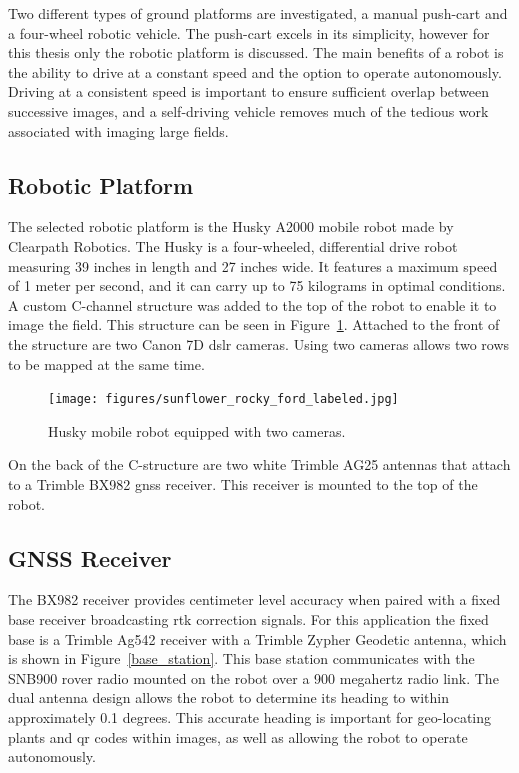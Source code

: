 Two different types of ground platforms are investigated, a manual push-cart and a four-wheel robotic vehicle.  The push-cart excels in its simplicity, however for this thesis only the robotic platform is discussed.  The main benefits of a robot is the ability to drive at a constant speed and the option to operate autonomously.  Driving at a consistent speed is important to ensure sufficient overlap between successive images, and a self-driving vehicle removes much of the tedious work associated with imaging large fields.  

\subsection{Robotic Platform}

The selected robotic platform is the Husky A2000 mobile robot made by Clearpath Robotics.  The Husky is a four-wheeled, differential drive robot measuring 39 inches in length and 27 inches wide.  It features a maximum speed of 1 meter per second, and it can carry up to 75 kilograms in optimal conditions.  A custom C-channel structure was added to the top of the robot to enable it to image the field.  This structure can be seen in Figure~\ref{husky_rocky_ford}.  Attached to the front of the structure are two Canon 7D \ac{dslr} cameras.  Using two cameras allows two rows to be mapped at the same time. 

\begin{figure}
	\centering
    \texttt{[image: figures/sunflower\_rocky\_ford\_labeled.jpg]}
    \caption[Husky robot]{Husky mobile robot equipped with two cameras.}
    \label{husky_rocky_ford}
\end{figure}

On the back of the C-structure are two white Trimble AG25 antennas that attach to a Trimble BX982 \ac{gnss} receiver.  This receiver is mounted to the top of the robot.

\subsection{GNSS Receiver}

The BX982 receiver provides centimeter level accuracy when paired with a fixed base receiver broadcasting \ac{rtk} correction signals.  For this application the fixed base is a Trimble Ag542 receiver with a Trimble Zypher Geodetic antenna, which is shown in Figure~\ref{base_station}.  This base station communicates with the SNB900 rover radio mounted on the robot over a 900 megahertz radio link.   The dual antenna design allows the robot to determine its heading to within approximately 0.1 degrees.  This accurate heading is important for geo-locating plants and \ac{qr} codes within images, as well as allowing the robot to operate autonomously. 

